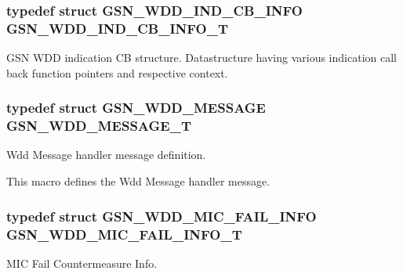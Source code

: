 \hypertarget{a00677_gaeb9f80300f95181d19a845e3f786daae}{
\subsubsection[{GSN\_\-WDD\_\-IND\_\-CB\_\-INFO\_\-T}]{\setlength{\rightskip}{0pt plus 5cm}typedef struct {\bf GSN\_\-WDD\_\-IND\_\-CB\_\-INFO} {\bf GSN\_\-WDD\_\-IND\_\-CB\_\-INFO\_\-T}}}
\label{a00677_gaeb9f80300f95181d19a845e3f786daae}


GSN WDD indication CB structure. Datastructure having various indication call back function pointers and respective context. 

\hypertarget{a00677_ga6dc6666c98a822d61766d4b3a8b6d2d5}{
\subsubsection[{GSN\_\-WDD\_\-MESSAGE\_\-T}]{\setlength{\rightskip}{0pt plus 5cm}typedef struct {\bf GSN\_\-WDD\_\-MESSAGE} {\bf GSN\_\-WDD\_\-MESSAGE\_\-T}}}
\label{a00677_ga6dc6666c98a822d61766d4b3a8b6d2d5}


Wdd Message handler message definition. 

This macro defines the Wdd Message handler message. \hypertarget{a00677_gae12a0e2aa7d3d161be1342b19d044cfb}{
\subsubsection[{GSN\_\-WDD\_\-MIC\_\-FAIL\_\-INFO\_\-T}]{\setlength{\rightskip}{0pt plus 5cm}typedef struct {\bf GSN\_\-WDD\_\-MIC\_\-FAIL\_\-INFO}  {\bf GSN\_\-WDD\_\-MIC\_\-FAIL\_\-INFO\_\-T}}}
\label{a00677_gae12a0e2aa7d3d161be1342b19d044cfb}


MIC Fail Countermeasure Info. 


